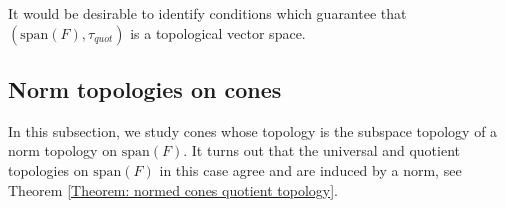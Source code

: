 \documentclass[a4paper,11pt]{article}
\numberwithin{equation}{section}
\theoremstyle{definition}
\newtheorem{Definition}{Definition}[section]
\theoremstyle{plain}
\newcommand\red[1]{{\color{red} {#1}}}
\newcommand{\R}{\mathbb R}
\newcommand{\spn}{\mathrm{span}}
\begin{document}
It would be desirable to identify conditions which guarantee that $(\spn(F), \tau_{quot})$ is a topological vector space.

\subsection{Norm topologies on cones}

In this subsection, we study cones whose topology is the subspace topology of a norm topology on $\spn(F)$. It turns out that the universal and quotient topologies on $\spn(F)$ in this case agree and are induced by a norm, see Theorem \ref{Theorem: normed cones quotient topology}.


\end{document}
